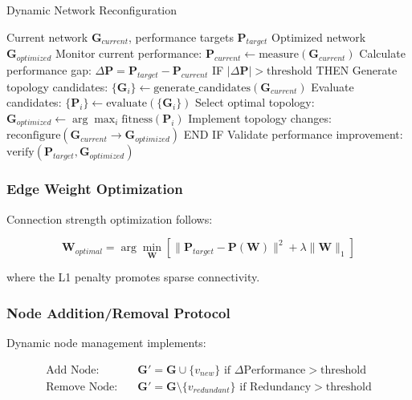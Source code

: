 \begin{algorithm}[H]
\caption{Dynamic Network Reconfiguration}
\begin{algorithmic}[1]
\REQUIRE Current network $\mathbf{G}_{current}$, performance targets $\mathbf{P}_{target}$
\ENSURE Optimized network $\mathbf{G}_{optimized}$
\STATE Monitor current performance: $\mathbf{P}_{current} \leftarrow \text{measure}(\mathbf{G}_{current})$
\STATE Calculate performance gap: $\Delta \mathbf{P} = \mathbf{P}_{target} - \mathbf{P}_{current}$
\STATE IF $|\Delta \mathbf{P}| > \text{threshold}$ THEN
\STATE \quad Generate topology candidates: $\{\mathbf{G}_i\} \leftarrow \text{generate\_candidates}(\mathbf{G}_{current})$
\STATE \quad Evaluate candidates: $\{\mathbf{P}_i\} \leftarrow \text{evaluate}(\{\mathbf{G}_i\})$
\STATE \quad Select optimal topology: $\mathbf{G}_{optimized} \leftarrow \arg\max_i \text{fitness}(\mathbf{P}_i)$
\STATE \quad Implement topology changes: $\text{reconfigure}(\mathbf{G}_{current} \rightarrow \mathbf{G}_{optimized})$
\STATE END IF
\STATE Validate performance improvement: $\text{verify}(\mathbf{P}_{target}, \mathbf{G}_{optimized})$
\end{algorithmic}
\end{algorithm}

\subsubsection{Edge Weight Optimization}

Connection strength optimization follows:

\begin{equation}
\mathbf{W}_{optimal} = \arg\min_{\mathbf{W}} \left[ \|\mathbf{P}_{target} - \mathbf{P}(\mathbf{W})\|^2 + \lambda \|\mathbf{W}\|_1 \right]
\end{equation}

where the L1 penalty promotes sparse connectivity.

\subsubsection{Node Addition/Removal Protocol}

Dynamic node management implements:

\begin{align}
\text{Add Node}: &\quad \mathbf{G}' = \mathbf{G} \cup \{v_{new}\} \text{ if } \Delta \text{Performance} > \text{threshold} \\
\text{Remove Node}: &\quad \mathbf{G}' = \mathbf{G} \setminus \{v_{redundant}\} \text{ if } \text{Redundancy} > \text{threshold}
\end{align}

